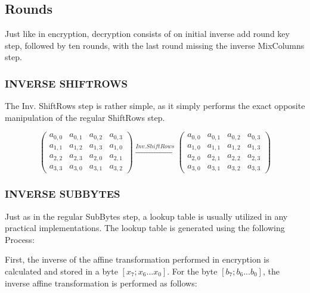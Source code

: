 \documentclass[12pt]{report}
\theoremstyle{definition}
\theoremstyle{remark}
\begin{document}
\subsection{Rounds}
Just like in encryption, decryption consists of on initial inverse add round key step, followed by ten rounds, with the last round missing the inverse MixColumns step.

\subsubsection{INVERSE SHIFTROWS}
The Inv. ShiftRows step is rather simple, as it simply performs the exact opposite manipulation of the regular ShiftRows step.

\[
\left( \begin{array}{cccc}
a_{0,0} & a_{0,1} & a_{0,2} & a_{0,3} \\
a_{1,1} & a_{1,2} & a_{1,3} & a_{1,0} \\
a_{2,2} & a_{2,3} & a_{2,0} & a_{2,1} \\
a_{3,3} & a_{3,0} & a_{3,1} & a_{3,2}\end{array} \right)
\xrightarrow{Inv. ShiftRows}
\left( \begin{array}{cccc}
a_{0,0} & a_{0,1} & a_{0,2} & a_{0,3} \\
a_{1,0} & a_{1,1} & a_{1,2} & a_{1,3} \\
a_{2,0} & a_{2,1} & a_{2,2} & a_{2,3} \\
a_{3,0} & a_{3,1} & a_{3,2} & a_{3,3}\end{array} \right)
\]

\subsubsection{INVERSE SUBBYTES}
Just as in the regular SubBytes step, a lookup table is usually utilized in any practical implementations. The lookup table is generated using the following Process:

First, the inverse of the affine transformation performed in encryption is calculated and stored in a byte $[x_7;x_6...x_0]$. For the byte $[b_7;b_6...b_0]$, the inverse affine transformation is performed as follows:
\end{document}
